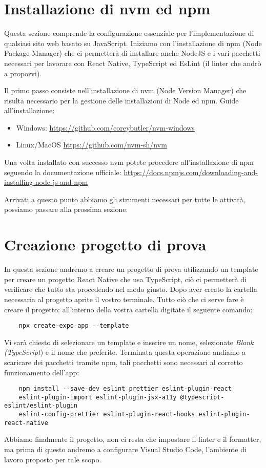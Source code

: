 \section{Installazione di nvm ed npm}
Questa sezione comprende la configurazione essenziale per l'implementazione di
qualsiasi sito web basato su JavaScript. Iniziamo con l'installazione
di npm (Node Package Manager) che ci permetterà di installare anche NodeJS e i vari pacchetti necessari per lavorare con React Native, TypeScript ed EsLint (il linter che andrò a proporvi).

Il primo passo consiste nell'installazione di nvm (Node Version Manager) che risulta necessario per la gestione delle installazioni di Node ed npm. Guide
all'installazione:
\begin{itemize}
    \item Windows: \url{https://github.com/coreybutler/nvm-windows}
    \item Linux/MacOS \url{https://github.com/nvm-sh/nvm}
\end{itemize}

Una volta installato con successo nvm potete procedere all'installazione di npm seguendo la documentazione ufficiale: \url{https://docs.npmjs.com/downloading-and-installing-node-js-and-npm}

\bigskip

Arrivati a questo punto abbiamo gli strumenti necessari per tutte le attività, possiamo passare alla prossima sezione.

\section{Creazione progetto di prova}
In questa sezione andremo a creare un progetto di prova utilizzando un template per creare un progetto React Native che usa TypeScript, ciò ci permetterà di verificare che tutto sta procedendo nel modo giusto. Dopo aver creato la cartella necessaria al progetto aprite il vostro terminale. Tutto ciò che ci serve fare è creare il progetto: all'interno della vostra cartella digitate il seguente comando:
\begin{verbatim}
    npx create-expo-app --template
\end{verbatim}
Vi sarà chiesto di selezionare un template e inserire un nome, selezionate \textit{Blank (TypeScript}) e il nome che preferite.
Terminata questa operazione andiamo a scaricare dei pacchetti tramite npm, tali pacchetti sono necessari al corretto funzionamento dell'app:
\begin{verbatim}
    npm install --save-dev eslint prettier eslint-plugin-react
    eslint-plugin-import eslint-plugin-jsx-a11y @typescript-eslint/eslint-plugin
    eslint-config-prettier eslint-plugin-react-hooks eslint-plugin-react-native
\end{verbatim}
Abbiamo finalmente il progetto, non ci resta che impostare il linter e il formatter, ma prima di questo andremo a configurare Visual Studio Code, l'ambiente di lavoro proposto per tale scopo.

